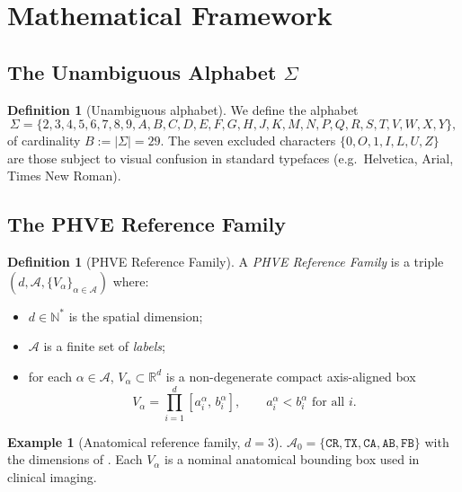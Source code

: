 \documentclass[11pt,a4paper]{article}
\theoremstyle{plain}
\theoremstyle{definition}
\newtheorem{definition}[theorem]{Definition}
\newtheorem{example}[theorem]{Example}
\theoremstyle{remark}
\newcommand{\N}{\mathbb{N}}
\newcommand{\R}{\mathbb{R}}
\begin{document}
\section{Mathematical Framework}\label{sec:framework}

\subsection{The Unambiguous Alphabet \texorpdfstring{$\Sigma$}{Sigma}}
\label{sec:framework_alphabet}

\begin{definition}[Unambiguous alphabet]\label{def:alphabet}
We define the alphabet
\[
\Sigma = \{2,3,4,5,6,7,8,9,A,B,C,D,E,F,G,H,J,K,M,N,P,Q,R,S,T,V,W,X,Y\},
\]
of cardinality $B := |\Sigma| = 29$. The seven excluded characters
$\{0,O,1,I,L,U,Z\}$ are those subject to visual confusion in standard
typefaces (e.g.\ Helvetica, Arial, Times New Roman).
\end{definition}

\subsection{The PHVE Reference Family}
\label{sec:framework_family}

\begin{definition}[PHVE Reference Family]\label{def:phve_family}
A \emph{PHVE Reference Family} is a triple
$(d,\mathcal{A},\{V_\alpha\}_{\alpha\in\mathcal{A}})$ where:
\begin{itemize}[nosep]
\item $d\in\N^*$ is the spatial dimension;
\item $\mathcal{A}$ is a finite set of \emph{labels};
\item for each $\alpha\in\mathcal{A}$, $V_\alpha\subset\R^d$ is a
non-degenerate compact axis-aligned box
\[
V_\alpha = \prod_{i=1}^d [a_i^\alpha,\,b_i^\alpha],\qquad
a_i^\alpha < b_i^\alpha\text{ for all }i.
\]
\end{itemize}
\end{definition}

\begin{example}[Anatomical reference family, $d=3$]
\label{ex:anatomical}
$\mathcal{A}_0 = \{\mathtt{CR},\mathtt{TX},\mathtt{CA},\mathtt{AB},\mathtt{FB}\}$
with the dimensions of . Each $V_\alpha$ is a
nominal anatomical bounding box used in clinical imaging.
\end{example}
\end{document}
